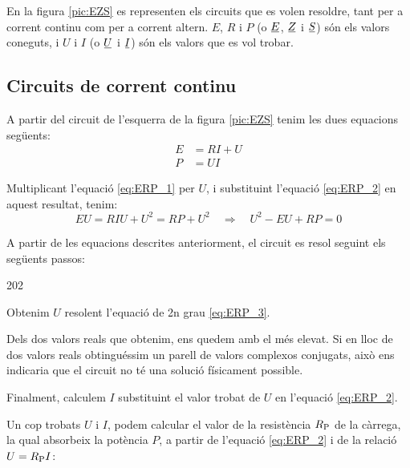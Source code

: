 En la figura \vref{pic:EZS} es representen els circuits que es volen
resoldre, tant per a corrent continu com per a corrent altern. $E$,
$R$ i $P$ (o $\cmplx{E}$, $\cmplx{Z}$ i $\cmplx{S}$) són els valors
coneguts, i $U$ i $I$ (o $\cmplx{U}$ i $\cmplx{I}$) són els valors
que es vol trobar.

\begin{center}
   
     \label{pic:EZS}
\end{center}

\subsection{Circuits de corrent continu}

A partir del circuit de l'esquerra de la figura \vref{pic:EZS} tenim les dues equacions següents:
\begin{align}
   E &= R I + U \label{eq:ERP_1} \\
   P &= U I     \label{eq:ERP_2}
\end{align}

Multiplicant l'equació \eqref{eq:ERP_1} per $U$, i substituint l'equació \eqref{eq:ERP_2} en aquest resultat, tenim:
\begin{equation}
   E U = R I U + U^2 = R P + U^2 \quad \Rightarrow \quad U^2 - E U + R P = 0 \label{eq:ERP_3}
\end{equation}

A partir de les equacions descrites anteriorment, el circuit es resol seguint els següents passos:
\begin{dingautolist}{202}
   \item Obtenim $U$ resolent l'equació de 2n grau \eqref{eq:ERP_3}.
   \item Dels dos valors reals que obtenim, ens quedem amb el més elevat. Si en lloc de dos valors reals obtinguéssim
   un parell de valors  complexos conjugats, això ens indicaria que el circuit no té una solució físicament possible.
   \item Finalment, calculem $I$ substituint el valor trobat de $U$ en l'equació \eqref{eq:ERP_2}.
\end{dingautolist}

Un cop trobats $U$ i $I$, podem calcular el valor de la resistència
$R_\mathrm{P}$ de la càrrega, la qual absorbeix la potència $P$, a
partir de l'equació \eqref{eq:ERP_2} i de la relació $U =R_\mathrm{P}
I$:

